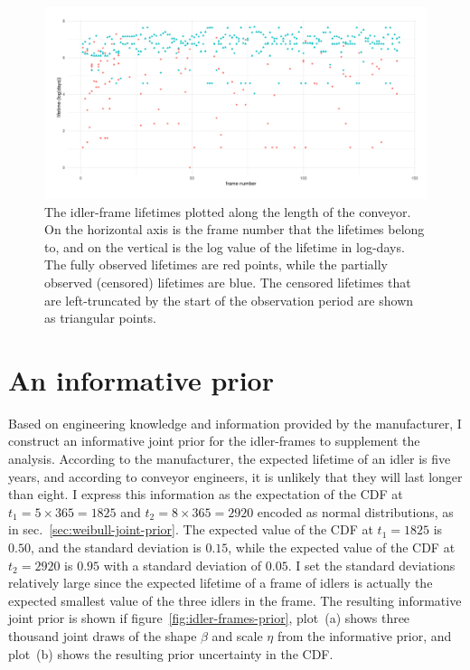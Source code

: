 \begin{figure}
  \centering
  \includegraphics[width=1\textwidth]{./figures/ch-3/idler-frame-data.pdf}
  \caption{The idler-frame lifetimes plotted along the length of the conveyor. On the horizontal axis is the frame number that the lifetimes belong to, and on the vertical is the log value of the lifetime in log-days. The fully observed lifetimes are red points, while the partially observed (censored) lifetimes are blue. The censored lifetimes that are left-truncated by the start of the observation period are shown as triangular points.}
  \label{fig:idler-frames-data}
\end{figure}

\section{An informative prior} \label{sec:idler-frame-joint-prior}

Based on engineering knowledge and information provided by the manufacturer, I construct an informative joint prior for the idler-frames to supplement the analysis. According to the manufacturer, the expected lifetime of an idler is five years, and according to conveyor engineers, it is unlikely that they will last longer than eight. I express this information as the expectation of the CDF at $t_1 = 5 \times 365 = 1825$ and $t_2 = 8 \times 365 = 2920$ encoded as normal distributions, as in sec.~\ref{sec:weibull-joint-prior}. The expected value of the CDF at $t_1 = 1825$ is $0.50$, and the standard deviation is $0.15$, while the expected value of the CDF at $t_2 = 2920$ is $0.95$ with a standard deviation of $0.05$. I set the standard deviations relatively large since the expected lifetime of a frame of idlers is actually the expected smallest value of the three idlers in the frame. The resulting informative joint prior is shown if figure~\ref{fig:idler-frames-prior}, plot~(a) shows three thousand joint draws of the shape $\beta$ and scale $\eta$ from the informative prior, and plot~(b) shows the resulting prior uncertainty in the CDF.

